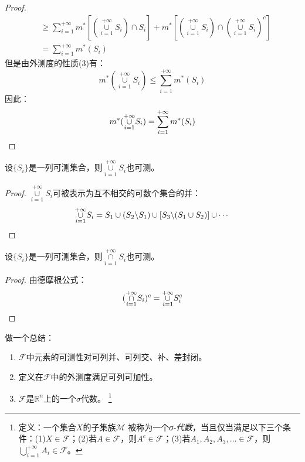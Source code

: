 \begin{proof}
\begin{align*}
		&\geqslant\sum_{i=1}^{+\infty} m^*[(\underset{i=1}{\overset{+\infty}{\cup}}S_i)\cap S_i]+m^*[(\underset{i=1}{\overset{+\infty}{\cup}}S_i)\cap(\underset{i=1}{\overset{+\infty}{\cup}}S_i)^c] \\
		&=\sum_{i=1}^{+\infty} m^*(S_i)
	\end{align*}
	但是由外测度的性质(3)有：
	\begin{equation*}
		m^*(\underset{i=1}{\overset{+\infty}{\cup}}S_i)\leqslant\sum_{i=1}^{+\infty} m^*(S_i)
	\end{equation*}
	因此：
	\begin{equation*}
		m^*(\underset{i=1}{\overset{+\infty}{\cup}}S_i)=\sum_{i=1}^{+\infty} m^*(S_i)\qedhere
	\end{equation*}
\end{proof}
\begin{corollary}
	设$\{S_i\}$是一列可测集合，则$\underset{i=1}{\overset{+\infty}{\cup}}S_i$也可测。
\end{corollary}
\begin{proof}
	$\underset{i=1}{\overset{+\infty}{\cup}}S_i$可被表示为互不相交的可数个集合的并：
	\begin{equation*}
		\underset{i=1}{\overset{+\infty}{\cup}}S_i=S_1\cup (S_2\backslash S_1)\cup[S_3\backslash(S_1\cup S_2)]\cup\cdots\qedhere
	\end{equation*}
\end{proof}
\begin{theorem}
	设$\{S_i\}$是一列可测集合，则$\underset{i=1}{\overset{+\infty}{\cap}}S_i$也可测。
\end{theorem}
\begin{proof}
	由德摩根公式：
	\begin{equation*}
		(\underset{i=1}{\overset{+\infty}{\cap}}S_i)^c=\underset{i=1}{\overset{+\infty}{\cup}}S_i^c\qedhere
	\end{equation*}
\end{proof}
做一个总结：
\begin{enumerate}
	\item $\mathcal{F}$中元素的可测性对可列并、可列交、补、差封闭。
	\item 定义在$\mathcal{F}$中的外测度满足可列可加性。
	\item $\mathcal{F}$是$\mathbb{R}^n$上的一个$\sigma$代数。
	 \footnote{定义：一个集合\(X\)的子集族\(\mathcal{M}\) 被称为一个\emph{σ-代数}，当且仅当满足以下三个条件：(1)\(X\in\mathcal{F}\)；(2)若\(A\in\mathcal{F}\)，则\(A^c\in\mathcal{F}\)；(3)若\(A_1,A_2,A_3,\dots\in\mathcal{F} \)，则 \(\bigcup_{i=1}^{+\infty}A_i\in\mathcal{F}\)。}
\end{enumerate}
